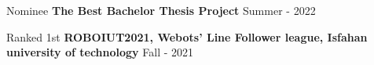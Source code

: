\begin{cventries}

    \cventry
    {Nominee}
    {\textbf {The Best Bachelor Thesis Project}}
    {}
    {Summer - 2022}
    {}
    \vspace{0.5 cm}

    \cventry
    {Ranked 1st}
    {\textbf {ROBOIUT2021, Webots’ Line Follower league, Isfahan university of technology}}
    {}
    {Fall - 2021}
    {}
\end{cventries}